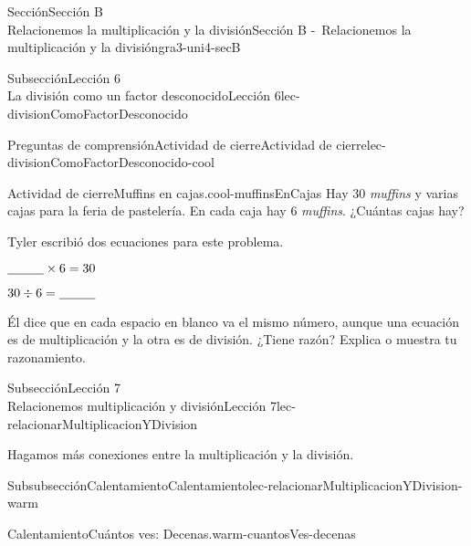 \begin{sectionptx}{Sección}{{\Large Sección B\\}Relacionemos la multiplicación y la división}{}{Sección B -~Relacionemos la multiplicación y la división}{}{}{gra3-uni4-secB}
\begin{subsectionptx}{Subsección}{{\normalsize Lección 6\\[-0.05cm]}La división como un factor desconocido}{}{Lección 6}{}{}{lec-divisionComoFactorDesconocido}
\begin{reading-questions-subsubsection}{Preguntas de comprensión}{Actividad de cierre}{}{Actividad de cierre}{}{}{lec-divisionComoFactorDesconocido-cool}
\begin{project}{Actividad de cierre}{Muffins en cajas.}{cool-muffinsEnCajas}%
Hay 30 \emph{muffins} y varias cajas para la feria de pastelería. En cada caja hay 6 \emph{muffins}. ¿Cuántas cajas hay?%
\vspace{-1ex}
\begin{sidebyside}{2}{0.05}{0.05}{0.1}%
\begin{sbspanel}{0.4}%
Tyler escribió dos ecuaciones para este problema.%
\end{sbspanel}%
\begin{sbspanel}{0.4}%
\(\underline{\hspace{1 cm}} \times 6 = 30\)%
\par
\(30 \div 6 = \underline{\hspace{1 cm}}\)%
\end{sbspanel}%
\end{sidebyside}%
\vspace{-1ex}
Él dice que en cada espacio en blanco va el mismo número, aunque una ecuación es de multiplicación y la otra es de división. ¿Tiene razón? Explica o muestra tu razonamiento.%
\end{project}%
\end{reading-questions-subsubsection}
\end{subsectionptx}
%
%
\typeout{************************************************}
\typeout{************************************************}
%
\begin{subsectionptx}{Subsección}{{\normalsize Lección 7\\[-0.05cm]}Relacionemos multiplicación y división}{}{Lección 7}{}{}{lec-relacionarMultiplicacionYDivision}
\begin{introduction}{}%
Hagamos más conexiones entre la multiplicación y la división.%
\end{introduction}%
%
%
\typeout{************************************************}
\typeout{************************************************}
%
\begin{subsubsectionptx}{Subsubsección}{Calentamiento}{}{Calentamiento}{}{}{lec-relacionarMultiplicacionYDivision-warm}
\begin{exploration}{Calentamiento}{Cuántos ves: Decenas.}{warm-cuantosVes-decenas}%

\end{exploration}
\end{subsubsectionptx}
\end{subsectionptx}
\end{sectionptx}
